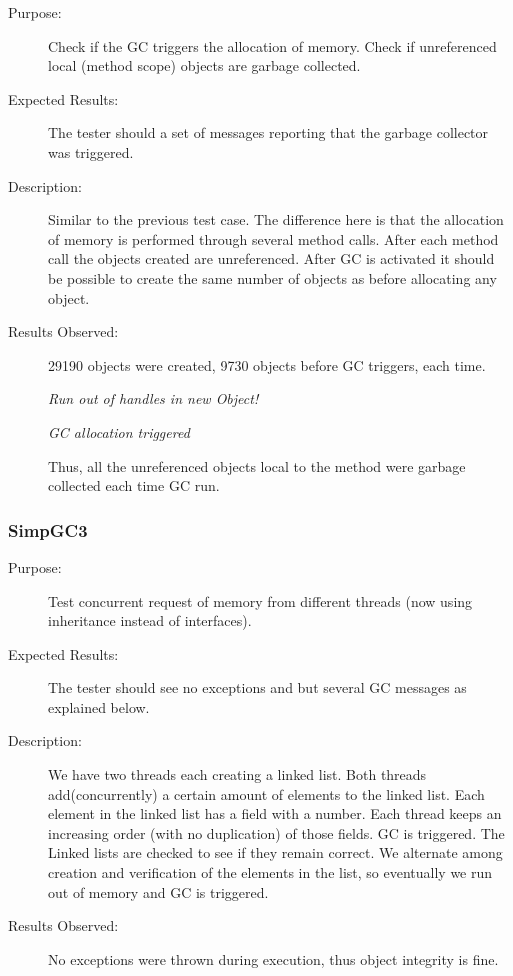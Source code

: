 \begin{description}
    \item[Purpose:]
Check if the GC triggers the allocation of memory. Check if
unreferenced local (method scope) objects are garbage collected.
    \item[Expected Results:]
The tester should a set of messages reporting that the garbage
collector was triggered.
    \item[Description:]
Similar to the previous test case. The difference here is that the
allocation of memory is performed through several method calls.
After each method call the objects created are unreferenced. After
GC is activated it should be possible to create the same number of
objects as before allocating any object.
    \item[Results Observed:]
29190 objects were created, 9730 objects before GC triggers, each
time.

\emph{Run out of handles in new Object!}

\emph{GC allocation triggered}

Thus, all the unreferenced objects local to the method were garbage
collected each time GC run.

\end{description}

\subsubsection{SimpGC3}

\begin{description}
    \item[Purpose:]
Test concurrent request of memory from different threads (now using
inheritance instead of interfaces).
    \item[Expected Results:]
The tester should see no exceptions and but several GC messages as
explained below.
    \item[Description:]
We have two threads each creating a linked list. Both threads
add(concurrently) a certain amount of elements to the linked list.
Each element in the linked list has a field with a number. Each
thread keeps an increasing order (with no duplication) of those
fields.  GC is triggered. The Linked lists are checked to see if
they remain correct. We alternate among creation and verification of
the elements in the list, so eventually we run out of memory and GC
is triggered.
    \item[Results Observed:]
No exceptions were thrown during execution, thus object integrity is
fine.
\end{description}

